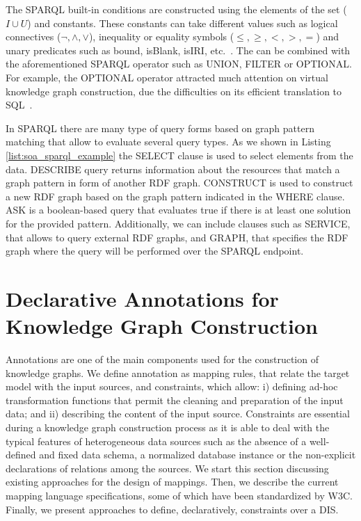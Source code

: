 \begin{table}[!ht]
\centering
\caption{Example of a SPARQL result-set}
\label{tab:soa_result_set}
\end{table}

The SPARQL built-in conditions are constructed using the elements of the set ($I \cup U$) and constants. These constants can take different values such as logical connectives ($\neg,\wedge,\vee $), inequality or equality symbols ($\leq,\geq,<,>,= $) and unary predicates such as bound, isBlank, isIRI, etc.~\citep{SPARQL}. The can be combined with the aforementioned SPARQL operator such as UNION, FILTER or OPTIONAL. For example, the OPTIONAL operator attracted much attention on virtual knowledge graph construction, due the difficulties on its efficient translation to SQL~\citep{xiao2018efficient}.

In SPARQL there are many type of query forms based on graph pattern matching that allow to evaluate several query types. As we shown in Listing \ref{list:soa_sparql_example} the SELECT clause is used to select elements from the data. DESCRIBE query returns information about the resources that match a graph pattern in form of another RDF graph. CONSTRUCT is used to construct a new RDF graph based on the graph pattern indicated in the WHERE clause. ASK is a boolean-based query that evaluates true if there is at least one solution for the provided pattern. Additionally, we can include clauses such as SERVICE, that allows to query external RDF graphs, and GRAPH, that specifies the RDF graph where the query will be performed over the SPARQL endpoint.

\section{Declarative Annotations for Knowledge Graph Construction}
\label{sec:soa_annotations}
Annotations are one of the main components used for the construction of knowledge graphs. We define annotation as mapping rules, that relate the target model with the input sources, and constraints, which allow: i) defining ad-hoc transformation functions that permit the cleaning and preparation of the input data; and ii) describing the content of the input source. Constraints are essential during a knowledge graph construction process as it is able to deal with the typical features of heterogeneous data sources such as the absence of a well-defined and fixed data schema, a normalized database instance or the non-explicit declarations of relations among the sources. We start this section discussing existing approaches for the design of mappings. Then, we describe the current mapping language specifications, some of which have been standardized by W3C. Finally, we present approaches to define, declaratively, constraints over a DIS.

